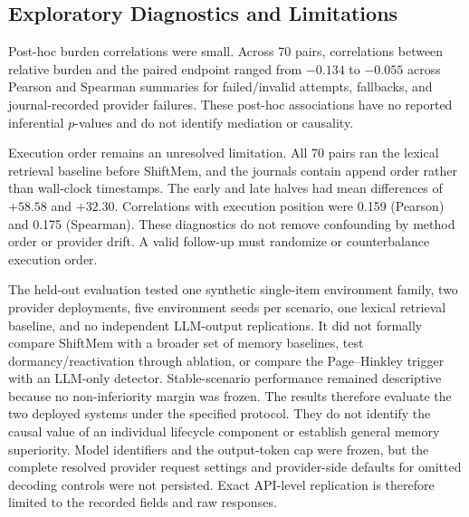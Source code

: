 \subsection{Exploratory Diagnostics and Limitations}
\label{sec:diagnostic-limits}

Post-hoc burden correlations were small. Across 70 pairs, correlations between
relative burden and the paired endpoint ranged from $-0.134$ to $-0.055$ across
Pearson and Spearman
summaries for failed/invalid attempts, fallbacks, and journal-recorded provider
failures. These post-hoc associations have no reported inferential $p$-values
and do not identify mediation or causality.

Execution order remains an unresolved limitation. All 70 pairs ran the lexical
retrieval baseline before ShiftMem, and the journals contain append order rather
than wall-clock timestamps. The early and late halves had mean differences of
$+58.58$ and $+32.30$. Correlations with execution position were 0.159
(Pearson) and 0.175 (Spearman). These diagnostics do not remove confounding by
method order or provider drift. A valid follow-up must randomize or
counterbalance execution order.

The held-out evaluation tested one synthetic single-item environment family, two
provider deployments, five environment seeds per scenario, one lexical retrieval
baseline, and no independent LLM-output replications. It did not formally
compare ShiftMem with a broader set of memory baselines, test
dormancy/reactivation through ablation, or compare the Page--Hinkley trigger with
an LLM-only detector. Stable-scenario performance remained descriptive because
no non-inferiority margin was frozen. The results therefore evaluate the two
deployed systems under the specified protocol. They do not identify the causal
value of an individual lifecycle component or establish general memory
superiority. Model identifiers and the output-token cap were frozen, but the
complete resolved provider request settings and provider-side defaults for
omitted decoding controls were not persisted. Exact API-level replication is
therefore limited to the recorded fields and raw responses.
